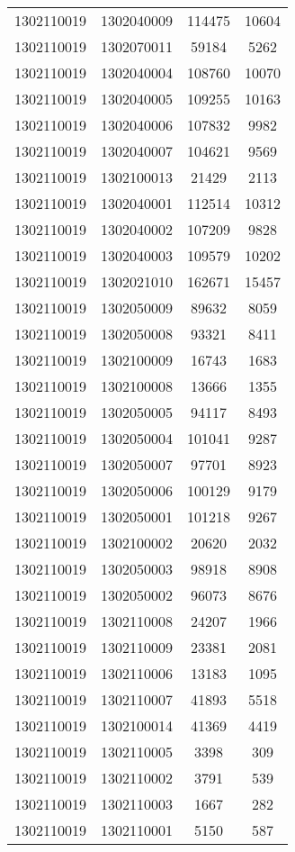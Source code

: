 \begin{longtable}{llcc}
1302110019 & 1302040009 & 114475 & 10604\\
1302110019 & 1302070011 & 59184 & 5262\\
1302110019 & 1302040004 & 108760 & 10070\\
1302110019 & 1302040005 & 109255 & 10163\\
1302110019 & 1302040006 & 107832 & 9982\\
1302110019 & 1302040007 & 104621 & 9569\\
1302110019 & 1302100013 & 21429 & 2113\\
1302110019 & 1302040001 & 112514 & 10312\\
1302110019 & 1302040002 & 107209 & 9828\\
1302110019 & 1302040003 & 109579 & 10202\\
1302110019 & 1302021010 & 162671 & 15457\\
1302110019 & 1302050009 & 89632 & 8059\\
1302110019 & 1302050008 & 93321 & 8411\\
1302110019 & 1302100009 & 16743 & 1683\\
1302110019 & 1302100008 & 13666 & 1355\\
1302110019 & 1302050005 & 94117 & 8493\\
1302110019 & 1302050004 & 101041 & 9287\\
1302110019 & 1302050007 & 97701 & 8923\\
1302110019 & 1302050006 & 100129 & 9179\\
1302110019 & 1302050001 & 101218 & 9267\\
1302110019 & 1302100002 & 20620 & 2032\\
1302110019 & 1302050003 & 98918 & 8908\\
1302110019 & 1302050002 & 96073 & 8676\\
1302110019 & 1302110008 & 24207 & 1966\\
1302110019 & 1302110009 & 23381 & 2081\\
1302110019 & 1302110006 & 13183 & 1095\\
1302110019 & 1302110007 & 41893 & 5518\\
1302110019 & 1302100014 & 41369 & 4419\\
1302110019 & 1302110005 & 3398 & 309\\
1302110019 & 1302110002 & 3791 & 539\\
1302110019 & 1302110003 & 1667 & 282\\
1302110019 & 1302110001 & 5150 & 587\\

\end{longtable}
